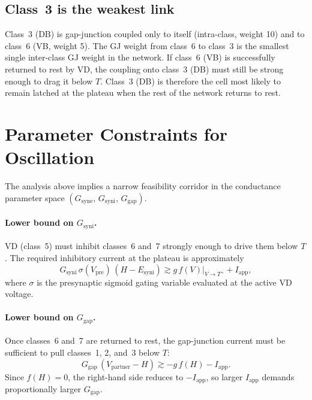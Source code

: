 \documentclass[11pt]{article}
\begin{document}
\subsection{Class~3 is the weakest link}

Class~3 (DB) is gap-junction coupled only to itself (intra-class, weight 10) and to class~6 (VB,
weight 5).  The GJ weight from class~6 to class~3 is the smallest single inter-class GJ weight in
the network.  If class~6 (VB) is successfully returned to rest by VD, the coupling onto class~3
(DB) must still be strong enough to drag it below $T$.  Class~3 (DB) is therefore the cell most
likely to remain latched at the plateau when the rest of the network returns to rest.

\section{Parameter Constraints for Oscillation}

The analysis above implies a narrow feasibility corridor in the conductance parameter space
$(G_{\mathrm{syne}},\, G_{\mathrm{syni}},\, G_{\mathrm{gap}})$.

\paragraph{Lower bound on $G_{\mathrm{syni}}$.}
VD (class~5) must inhibit classes~6 and~7 strongly enough to drive them below $T$.  The required
inhibitory current at the plateau is approximately
\begin{equation}
    G_{\mathrm{syni}}\,\sigma(V_{\mathrm{pre}})\,(H - E_{\mathrm{syni}})
    \gtrsim g\,f(V)\big|_{V \to T^+} + I_{\mathrm{app}},
\end{equation}
where $\sigma$ is the presynaptic sigmoid gating variable evaluated at the active VD voltage.

\paragraph{Lower bound on $G_{\mathrm{gap}}$.}
Once classes~6 and~7 are returned to rest, the gap-junction current must be sufficient to pull
classes~1, 2, and~3 below $T$:
\begin{equation}
    G_{\mathrm{gap}}\,(V_{\mathrm{partner}} - H) \gtrsim -g\,f(H) - I_{\mathrm{app}}.
\end{equation}
Since $f(H) = 0$, the right-hand side reduces to $-I_{\mathrm{app}}$, so larger $I_{\mathrm{app}}$
demands proportionally larger $G_{\mathrm{gap}}$.
\end{document}
